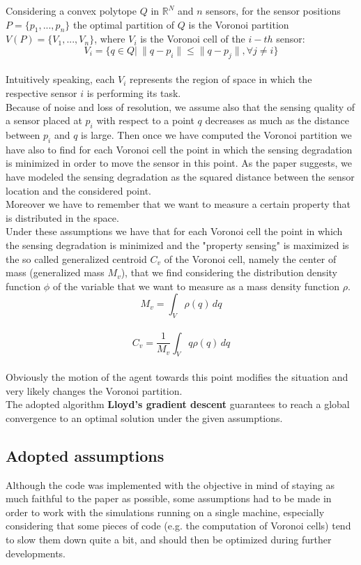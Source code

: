 \documentclass[a4paper,11pt,oneside]{book}
\begin{document}
\newpage %
	Considering a convex polytope $Q$ in $\mathbb{R}^N$ and $n$ sensors, for the sensor positions $P=\{p_1,...,p_n\}$ the optimal partition of $Q$ is the Voronoi partition  $V(P)=\{V_1,...,V_n\}$, where $V_i$ is the Voronoi cell of the $i-th$ sensor: $$V_i=\{q\in Q|\> \|q-p_i\|\le\|q-p_j\|, \forall j\not= i\}$$\\
	Intuitively speaking, each $V_i$ represents the region of space in which the respective sensor $i$ is performing its task.\\
	
	
	Because of noise and loss of resolution, we assume also that the sensing quality of a sensor placed at $p_i$ with respect to a point $q$ decreases as much as the distance between $p_i$ and $q$ is large. Then once we have computed the Voronoi partition we have also to find for each Voronoi cell the point in which the sensing degradation is minimized in order to move the sensor in this point. As the paper suggests, we have modeled the sensing degradation as the squared distance between the sensor location and the considered point.\\
	Moreover we have to remember that we want to measure a certain property that is distributed in the space.\\
	Under these assumptions we have that for each Voronoi cell the point in which the sensing degradation is minimized and the "property sensing" is maximized is the so called generalized centroid $C_v$ of the Voronoi cell, namely the center of mass (generalized mass $M_v$), that we find considering the distribution density function $\phi$ of the variable that we want to measure as a mass density function $\rho$.\\
	$$M_v=\int_{V} \rho(q)\, dq$$  \\ 
	$$C_v=\frac{1}{M_v} \int_{V} q \rho(q)\, dq$$  \\
	Obviously the motion of the agent towards this point modifies the situation and very likely changes the Voronoi partition.\\
	
	The adopted algorithm \textbf{Lloyd's gradient descent} guarantees to reach a global convergence to an optimal solution under the given assumptions.
	
	\subsection{Adopted assumptions}
	
	Although the code was implemented with the objective in mind of staying as much faithful to the paper as possible, some assumptions had to be made in order to work with the simulations running on a single machine, especially considering that some pieces of code (e.g. the computation of Voronoi cells) tend to slow them down quite a bit, and should then be optimized during further developments.\\ %
	
\end{document}
